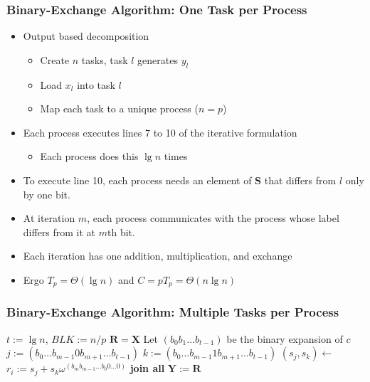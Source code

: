 \documentclass[xcolor=pdftex,dvipsnames,table]{presentation}
\begin{document}
\begin{frame}
	\frametitle{Binary-Exchange Algorithm: One Task per Process}

	\begin{itemize}
		\item Output based decomposition
		\begin{itemize}
			\item Create $n$ tasks, task $l$ generates $y_l$
			\item Load $x_l$ into task $l$
			\item Map each task to a unique process ($n=p$)
		\end{itemize}
		\item Each process executes lines 7 to 10 of the iterative formulation
		\begin{itemize}
			\item Each process does this $\lg n$ times
		\end{itemize}
		\item To execute line 10, each process needs an element of $\mathbf{S}$ that differs from $l$ only by one bit.
		\item At iteration $m$, each process communicates with the process whose label differs from it at $m$th bit.
		\item Each iteration has one addition, multiplication, and exchange
		\item Ergo $T_p = \Theta(\lg n)$ and $C=pT_p=\Theta(n\lg n)$
	\end{itemize}
\end{frame}

\begin{frame}
	\frametitle{Binary-Exchange Algorithm: Multiple Tasks per Process}

	\begin{algorithmic}[1]
			\State $t:=\lg n$, $BLK:=n/p$
			\State $\mathbf{R}=\mathbf{X}$
						\State Let $(b_0b_1\ldots b_{t-1})$ be the binary expansion of $c$
						\State $j:=(b_0\ldots b_{m-1}0b_{m+1}\ldots b_{t-1})$
						\State $k:=(b_0\ldots b_{m-1}1b_{m+1}\ldots b_{t-1})$
						\State $(s_j,s_k)\gets$
						\State $r_i:= s_j+s_k\omega^{(b_mb_{m-1}\ldots b_0 0\ldots0)}$
					\EndFor
				\EndFor
			\EndSpawn
			\State \textbf{join all}
			\State $\mathbf{Y}:=\mathbf{R}$
		\EndFunction
	\end{algorithmic}
\end{frame}
\end{document}
